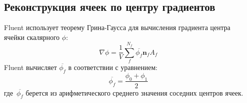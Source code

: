 \subsection{Реконструкция ячеек по центру градиентов}

Fluent использует теорему Грина-Гаусса для вычисления градиента центра ячейки скалярного \(\phi\):
\begin{equation}
\nabla \phi =\frac{1}{V}\sum _{f}^{{N}_{f}}\overline{{\phi_{f}}}{\boldsymbol n}_{f}{A}_{f}
\end{equation}
Fluent вычисляет \(\overline{\phi_{f}}\) в соответствии с уравнением:
\begin{equation}
\overline{{\phi_{f}}}= \frac{{\phi }_{0}+{\phi }_{1}}{2} 
\end{equation}
где~\(\overline{\phi_{f}}\) берется из арифметического среднего значения соседних центров ячеек.
